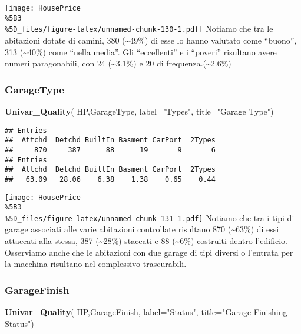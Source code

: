 \documentclass[
]{article}
\newenvironment{Shaded}{\begin{snugshade}}{\end{snugshade}}
\newcommand{\AttributeTok}[1]{\textcolor[rgb]{0.13,0.29,0.53}{#1}}
\newcommand{\FunctionTok}[1]{\textcolor[rgb]{0.13,0.29,0.53}{\textbf{#1}}}
\newcommand{\NormalTok}[1]{#1}
\newcommand{\StringTok}[1]{\textcolor[rgb]{0.31,0.60,0.02}{#1}}
\begin{document}
\texttt{[image: HousePrice\\\%5B3\\\%5D\_files/figure-latex/unnamed-chunk-130-1.pdf]}
Notiamo che tra le abitazioni dotate di camini, 380
(\textasciitilde49\%) di esse lo hanno valutato come ``buono'', 313
(\textasciitilde40\%) come ``nella media''. Gli ``eccellenti'' e i
``poveri'' risultano avere numeri paragonabili, con 24
(\textasciitilde3.1\%) e 20 di frequenza.(\textasciitilde2.6\%)

\subsubsection{GarageType}\label{garagetype}

\begin{Shaded}
\begin{Highlighting}[]
\FunctionTok{Univar\_Quality}\NormalTok{(}
\NormalTok{  HP,GarageType,}
  \AttributeTok{label=}\StringTok{"Types"}\NormalTok{,}
  \AttributeTok{title=}\StringTok{"Garage Type"}\NormalTok{)}
\end{Highlighting}
\end{Shaded}

\begin{verbatim}
## Entries
##  Attchd  Detchd BuiltIn Basment CarPort  2Types 
##     870     387      88      19       9       6 
## Entries
##  Attchd  Detchd BuiltIn Basment CarPort  2Types 
##   63.09   28.06    6.38    1.38    0.65    0.44
\end{verbatim}

\texttt{[image: HousePrice\\\%5B3\\\%5D\_files/figure-latex/unnamed-chunk-131-1.pdf]}
Notiamo che tra i tipi di garage associati alle varie abitazioni
controllate risultano 870 (\textasciitilde63\%) di essi attaccati alla
stessa, 387 (\textasciitilde28\%) staccati e 88 (\textasciitilde6\%)
costruiti dentro l'edificio. Osserviamo anche che le abitazioni con due
garage di tipi diversi o l'entrata per la macchina risultano nel
complessivo trascurabili.

\subsubsection{GarageFinish}\label{garagefinish}

\begin{Shaded}
\begin{Highlighting}[]
\FunctionTok{Univar\_Quality}\NormalTok{(}
\NormalTok{  HP,GarageFinish,}
  \AttributeTok{label=}\StringTok{"Status"}\NormalTok{,}
  \AttributeTok{title=}\StringTok{"Garage Finishing Status"}\NormalTok{)}
\end{Highlighting}
\end{Shaded}
\end{document}
